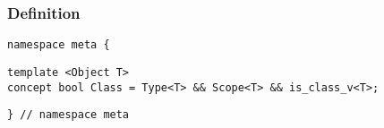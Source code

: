 
\subsubsection{Definition}

\begin{verbatim}
namespace meta {
\end{verbatim}
\begin{verbatim}
template <Object T>
concept bool Class = Type<T> && Scope<T> && is_class_v<T>;

\end{verbatim}
\begin{verbatim}
} // namespace meta
\end{verbatim}
